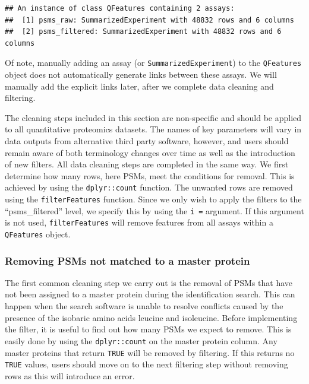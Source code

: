 \documentclass[9pt,a4paper,]{extarticle}
\begin{document}
\begin{verbatim}
## An instance of class QFeatures containing 2 assays:
##  [1] psms_raw: SummarizedExperiment with 48832 rows and 6 columns 
##  [2] psms_filtered: SummarizedExperiment with 48832 rows and 6 columns
\end{verbatim}

Of note, manually adding an assay (or \texttt{SummarizedExperiment}) to the \texttt{QFeatures}
object does not automatically generate links between these assays. We will
manually add the explicit links later, after we complete data cleaning and
filtering.

The cleaning steps included in this section are non-specific and should be applied
to all quantitative proteomics datasets. The names of key parameters will vary in
data outputs from alternative third party software, however, and users should
remain aware of both terminology changes over time as well as the introduction
of new filters. All data cleaning steps are completed in the same way. We first
determine how many rows, here PSMs, meet the conditions for removal. This is
achieved by using the \texttt{dplyr::count} function. The unwanted rows are removed
using the \texttt{filterFeatures} function. Since we only wish to apply the filters to
the ``psms\_filtered'' level, we specify this by using the \texttt{i\ =} argument. If this
argument is not used, \texttt{filterFeatures} will remove features from all assays
within a \texttt{QFeatures} object.

\subsubsection{Removing PSMs not matched to a master protein}\label{removing-psms-not-matched-to-a-master-protein}

The first common cleaning step we carry out is the removal of PSMs that have not
been assigned to a master protein during the identification search. This can
happen when the search software is unable to resolve conflicts caused by the
presence of the isobaric amino acids leucine and isoleucine. Before implementing
the filter, it is useful to find out how many PSMs we expect to remove. This is
easily done by using the \texttt{dplyr::count} on the master protein column. Any master
proteins that return \texttt{TRUE} will be removed by filtering. If this returns
no \texttt{TRUE} values, users should move on to the next filtering step without
removing rows as this will introduce an error.
\end{document}
